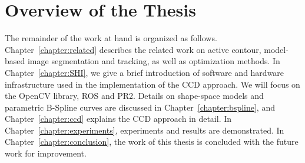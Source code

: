 

\section{Overview of the Thesis}
\label{sec:overview}
The remainder of the work at hand is organized as
follows. Chapter~\ref{chapter:related} describes the related work on
active contour, model-based image segmentation and tracking, as well
as optimization methods. In Chapter~\ref{chapter:SHI}, we give a brief introduction of software
and hardware infrastructure used in the implementation of the CCD
approach. We will focus on the OpenCV library, ROS and PR2. Details on shape-space models and parametric
B-Spline curves are discussed in Chapter~\ref{chapter:bspline},  and
Chapter~\ref{chapter:ccd} explains the CCD approach in detail. 
In Chapter~\ref{chapter:experiments}, experiments and results are demonstrated.%
In Chapter~\ref{chapter:conclusion},
the work of this thesis is concluded with the future work for improvement.



